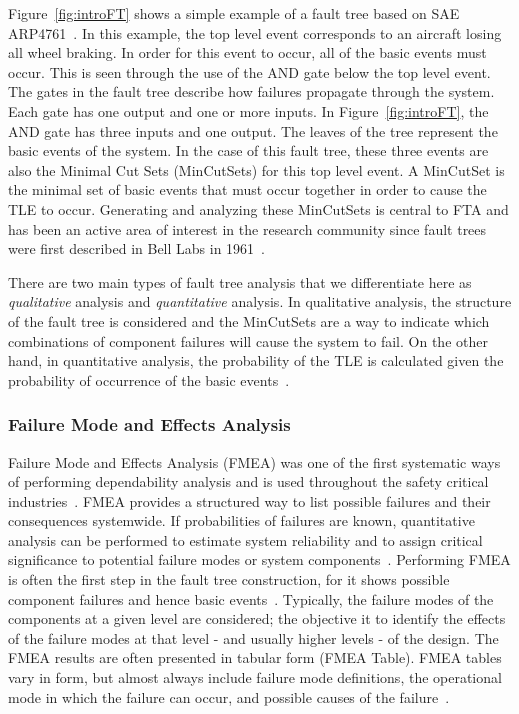 Figure~\ref{fig:introFT} shows a simple example of a fault tree based on SAE ARP4761~\cite{SAE:ARP4761}. In this example, the top level event corresponds to an aircraft losing all wheel braking. In order for this event to occur, all of the basic events must occur. This is seen through the use of the AND gate below the top level event. The gates in the fault tree describe how failures propagate through the system. Each gate has one output and one or more inputs. In Figure~\ref{fig:introFT}, the AND gate has three inputs and one output. The leaves of the tree represent the basic events of the system. %
In the case of this fault tree, these three events are also the Minimal Cut Sets (MinCutSets) for this top level event. A MinCutSet is the minimal set of basic events that must occur together in order to cause the TLE to occur. Generating and analyzing these MinCutSets is central to FTA and has been an active area of interest in the research community since fault trees were first described in Bell Labs in 1961~\cite{historyFTA,0f356f05e72f43018211b36f97c8854a}. 

There are two main types of fault tree analysis that we differentiate here as \textit{qualitative} analysis and \textit{quantitative} analysis. In qualitative analysis, the structure of the fault tree is considered and the MinCutSets are a way to indicate which combinations of component failures will cause the system to fail. On the other hand, in quantitative analysis, the probability of the TLE is calculated given the probability of occurrence of the basic events~\cite{0f356f05e72f43018211b36f97c8854a}. 

\subsubsection{Failure Mode and Effects Analysis}
 Failure Mode and Effects Analysis (FMEA) was one of the first systematic ways of performing dependability analysis and is used throughout the safety critical industries~\cite{rausand2003system,Bozzano:2011:SDP:1992983.1992988}. FMEA provides a structured way to list possible failures and their consequences systemwide. If probabilities of failures are known, quantitative analysis can be performed to estimate system reliability and to assign critical significance to potential failure modes or system components~\cite{MilStandardFMEA}. Performing FMEA is often the first step in the fault tree construction, for it shows possible component failures and hence basic events~\cite{0f356f05e72f43018211b36f97c8854a}. Typically, the failure modes of the components at a given level are considered; the objective it to identify the effects of the failure modes at that level - and usually higher levels - of the design. The FMEA results are often presented in tabular form (FMEA Table). FMEA tables vary in form, but almost always include failure mode definitions, the operational mode in which the failure can occur, and possible causes of the failure~\cite{Bozzano:2010:DSA:1951720}.

